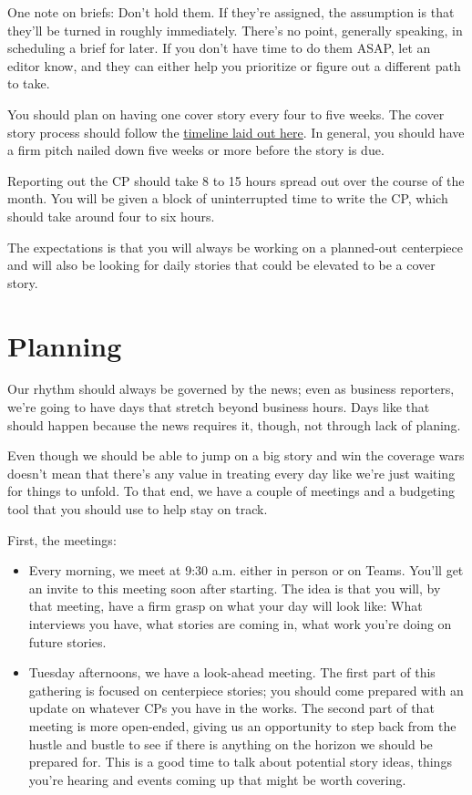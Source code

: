 \documentclass[
  11pt,
  american,
  letterpaperpaper,
  extrafontsizes,onecolumn,openright
  ]{memoir}
\providecommand{\tightlist}{%
  \setlength{\itemsep}{0pt}\setlength{\parskip}{0pt}}
\begin{document}
One note on briefs: Don't hold them. If they're assigned, the assumption is that they'll be turned in roughly immediately. There's no point, generally speaking, in scheduling a brief for later. If you don't have time to do them ASAP, let an editor know, and they can either help you prioritize or figure out a different path to take.

You should plan on having one cover story every four to five weeks. The cover story process should follow the \href{https://docs.google.com/spreadsheets/d/1NA5khaUA2TEatah0DSByH2hUVMbGpzMzeFEqfeBC0-Q/edit\#gid=1493329012}{timeline laid out here}. In general, you should have a firm pitch nailed down five weeks or more before the story is due.

Reporting out the CP should take 8 to 15 hours spread out over the course of the month. You will be given a block of uninterrupted time to write the CP, which should take around four to six hours.

The expectations is that you will always be working on a planned-out centerpiece and will also be looking for daily stories that could be elevated to be a cover story.

\hypertarget{planning}{%
\section*{Planning}\label{planning}}

Our rhythm should always be governed by the news; even as business reporters, we're going to have days that stretch beyond business hours. Days like that should happen because the news requires it, though, not through lack of planing.

Even though we should be able to jump on a big story and win the coverage wars doesn't mean that there's any value in treating every day like we're just waiting for things to unfold. To that end, we have a couple of meetings and a budgeting tool that you should use to help stay on track.

First, the meetings:

\begin{itemize}
\tightlist
\item
  Every morning, we meet at 9:30 a.m. either in person or on Teams. You'll get an invite to this meeting soon after starting. The idea is that you will, by that meeting, have a firm grasp on what your day will look like: What interviews you have, what stories are coming in, what work you're doing on future stories.
\item
  Tuesday afternoons, we have a look-ahead meeting. The first part of this gathering is focused on centerpiece stories; you should come prepared with an update on whatever CPs you have in the works. The second part of that meeting is more open-ended, giving us an opportunity to step back from the hustle and bustle to see if there is anything on the horizon we should be prepared for. This is a good time to talk about potential story ideas, things you're hearing and events coming up that might be worth covering.
\end{itemize}
\end{document}
